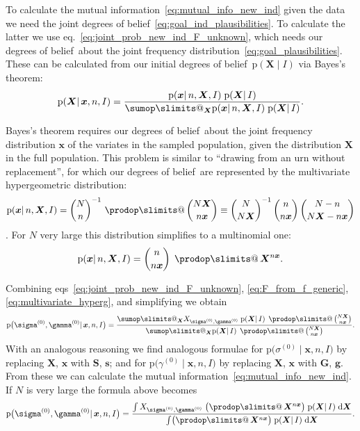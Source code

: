 \documentclass[\ifafour a4paper,12pt,\else a5paper,10pt,\fi%
onecolumn,oneside,article,%
british%
]{memoir}
\makeatletter
\theoremstyle{remark}
\theoremstyle{innote}
\def\sum{\DOTSI\sumop\slimits@}
\def\prod{\DOTSI\prodop\slimits@}
\newcommand*{\citep}{\parencites}
\newcommand*{\di}{\mathrm{d}}%
\newcommand*{\pf}{\mathrm{p}}%
\renewcommand*{\|}{\mathpunct{|}}
\newcommand*{\sect}{\S}%
\newcommand*{\chap}{ch.}%
\newcommand*{\eqn}{eq.}%
\newcommand*{\eqns}{eqs}%
\newcommand*{\tprod}{\mathop{\textstyle\prod}\nolimits}
\newcommand*{\dobs}{degrees of belief}
\newcommand*{\yI}{I}
\newcommand*{\yprod}{\tprod}
\newcommand*{\ys}{\sigma}
\newcommand*{\yg}{\gamma}
\newcommand*{\ysi}[1]{\ys^{(#1)}}
\newcommand*{\ygi}[1]{\yg^{(#1)}}
\newcommand*{\yso}{\ysi{0}}
\newcommand*{\ygo}{\ygi{0}}
\newcommand*{\yFs}{\bm{S}}
\newcommand*{\yfs}{\bm{s}}
\newcommand*{\yFg}{\bm{G}}
\newcommand*{\yfg}{\bm{g}}
\newcommand*{\yF}{\bm{X}}
\newcommand*{\yf}{\bm{x}}
\makeatother
\begin{document}
\medskip

To calculate the mutual information~\eqref{eq:mutual_info_new_ind} given
the data we need the joint \dobs~\eqref{eq:goal_ind_plausibilities}. To
calculate the latter we use \eqn~\eqref{eq:joint_prob_new_ind_F_unknown},
which needs our \dobs\ about the joint frequency
distribution~\eqref{eq:goal_plausibilities}. These can be calculated from
our initial \dobs\ $\pf( \yF \| \yI)$ via Bayes's theorem:
\begin{equation}
  \label{eq:F_from_f_generic}
  \pf(\yF \| \yf, n, \yI) =
  \frac{\pf(\yf \| n,\yF, \yI)\; \pf(\yF \| \yI)}{
  \sum_{\yF}\pf(\yf \| n,\yF, \yI)\; \pf(\yF \| \yI)}.
\end{equation}

Bayes's theorem requires our \dobs\ about the joint frequency distribution
$\yf$ of the variates in the sampled population, given the distribution
$\yF$ in the full population. This problem is similar to \enquote{drawing
  from an urn without replacement}, for which our \dobs\ are represented by
the multivariate hypergeometric distribution:
\begin{equation}
  \label{eq:multivariate_hyperg}
  \pf(\yf \| n,\yF, \yI) =
  \binom{N}{n}^{-1}\,\yprod\binom{N\yF}{n\yf}
  \equiv \binom{N}{N\yF}^{-1}\,\binom{n}{n\yf}\,\binom{N-n}{N\yF-n\yf}
\end{equation}
\citep{ghoshetal1997}[parts~I, VI]{freedmanetal1978_r2007}[summaries
in][\chap~8]{gelmanetal1995_r2014}[\chap~3]{jaynes1994_r2003}[properties of
this distribution are discussed
in][\sect~4.8.3]{ross1976_r2010}[\sect~II.6]{feller1950_r1968}. For $N$
very large this distribution simplifies to a multinomial one:
\begin{equation}
  \label{eq:multivariate_hyperg_Ninf}
  \pf(\yf \| n,\yF, \yI) =\binom{n}{n\yf} \;\yprod \yF^{n\yf}.
\end{equation}

Combining \eqns~\eqref{eq:joint_prob_new_ind_F_unknown},
\eqref{eq:F_from_f_generic}, \eqref{eq:multivariate_hyperg}, and
simplifying we obtain
\begin{equation}
  \label{eq:joint_prob_new_ind_full}
  \pf\bigl(\yso, \ygo \| \yf, n,\yI\bigr)  =
  \frac{
    \sum_{\yF} X_{\yso, \ygo}\;
    \pf(\yF \| \yI)\;\yprod\binom{N\yF}{n\yf}}{
  \sum_{\yF} \pf(\yF \| \yI)\;\yprod\binom{N\yF}{n\yf}}.
\end{equation}
With an analogous reasoning we find analogous formulae for
$\pf\bigl(\yso \| \yf, n,\yI\bigr)$ by replacing $\yF$, $\yf$ with
$\yFs$, $\yfs$; and for $\pf\bigl(\ygo \| \yf, n,\yI\bigr)$ by
replacing $\yF$, $\yf$ with $\yFg$, $\yfg$. From these we can calculate the
mutual information~\eqref{eq:mutual_info_new_ind}.
If $N$ is very large the formula above becomes
\begin{equation}
  \label{eq:joint_prob_new_ind_full_Ninf}
  \pf\bigl(\yso, \ygo \| \yf, n,\yI\bigr)  =
  \frac{
    \int X_{\yso, \ygo}\;\bigl( \yprod\yF^{n\yf} \bigr)\;
    \pf(\yF \| \yI)\;\di\yF}{
  \int\bigl( \yprod\yF^{n\yf} \bigr)\; \pf(\yF \| \yI)\;\di\yF}.
\end{equation}
\end{document}
